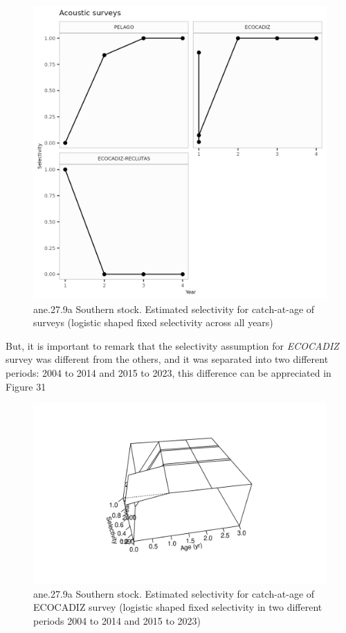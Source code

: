 \documentclass[
]{article}
\begin{document}
\begin{figure}[H]

{\centering \includegraphics[width=0.95\linewidth]{report/run/S1.0_4FLEETS_SelECO_RecIndex_Mnewfix/fig_Sel_surveys} 

}

\caption{ane.27.9a Southern stock. Estimated selectivity for catch-at-age of surveys (logistic shaped fixed selectivity across all years)}\label{fig:unnamed-chunk-62}
\end{figure}

But, it is important to remark that the selectivity assumption for
\emph{ECOCADIZ} survey was different from the others, and it was
separated into two different periods: 2004 to 2014 and 2015 to 2023,
this difference can be appreciated in Figure 31

\begin{figure}[H]

{\centering \includegraphics[width=0.95\linewidth]{output/run/S1.0_4FLEETS_SelECO/plots//sel11_timevary_surf_flt6sex1} 

}

\caption{ane.27.9a Southern stock. Estimated selectivity for catch-at-age of ECOCADIZ survey (logistic shaped fixed selectivity in two different periods 2004 to 2014 and 2015 to 2023)}\label{fig:unnamed-chunk-63}
\end{figure}
\end{document}
